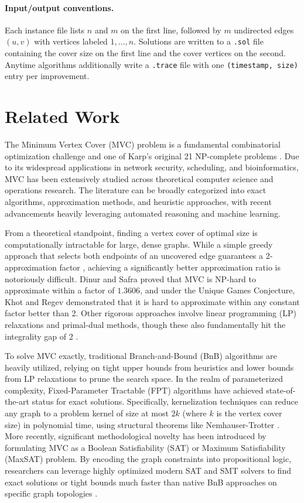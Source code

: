 \documentclass[sigconf]{acmart}
\begin{document}
\paragraph{Input/output conventions.} Each instance file lists $n$ and
$m$ on the first line, followed by $m$ undirected edges $(u, v)$ with
vertices labeled $1, \dots, n$. Solutions are written to a
\texttt{.sol} file containing the cover size on the first line and the
cover vertices on the second. Anytime algorithms additionally write a
\texttt{.trace} file with one \texttt{(timestamp, size)} entry per
improvement.

\section{Related Work}
\label{sec:related}
The Minimum Vertex Cover (MVC) problem is a fundamental combinatorial
optimization challenge and one of Karp's original 21 NP-complete
problems \cite{karp1972reducibility}. Due to its widespread
applications in network security, scheduling, and bioinformatics, MVC
has been extensively studied across theoretical computer science and
operations research. The literature can be broadly categorized into
exact algorithms, approximation methods, and heuristic approaches,
with recent advancements heavily leveraging automated reasoning and
machine learning.

From a theoretical standpoint, finding a vertex cover of optimal size
is computationally intractable for large, dense graphs. While a simple
greedy approach that selects both endpoints of an uncovered edge
guarantees a 2-approximation factor \cite{gavril1974}, achieving a
significantly better approximation ratio is notoriously difficult.
Dinur and Safra \cite{dinur2005approximating} proved that MVC is
NP-hard to approximate within a factor of $1.3606$, and under the
Unique Games Conjecture, Khot and Regev \cite{khot2008vertex}
demonstrated that it is hard to approximate within any constant factor
better than 2. Other rigorous approaches involve linear programming
(LP) relaxations and primal-dual methods, though these also
fundamentally hit the integrality gap of 2
\cite{hochbaum1982approximation}.

To solve MVC exactly, traditional Branch-and-Bound (BnB) algorithms
are heavily utilized, relying on tight upper bounds from heuristics
and lower bounds from LP relaxations to prune the search space. In the
realm of parameterized complexity, Fixed-Parameter Tractable (FPT)
algorithms have achieved state-of-the-art status for exact solutions.
Specifically, kernelization techniques can reduce any graph to a
problem kernel of size at most $2k$ (where $k$ is the vertex cover
size) in polynomial time, using structural theorems like
Nemhauser-Trotter \cite{nemhauser1975vertex}. More recently,
significant methodological novelty has been introduced by formulating
MVC as a Boolean Satisfiability (SAT) or Maximum Satisfiability
(MaxSAT) problem. By encoding the graph constraints into propositional
logic, researchers can leverage highly optimized modern SAT and SMT
solvers to find exact solutions or tight bounds much faster than
native BnB approaches on specific graph topologies \cite{li2020maxsat}.
\end{document}
